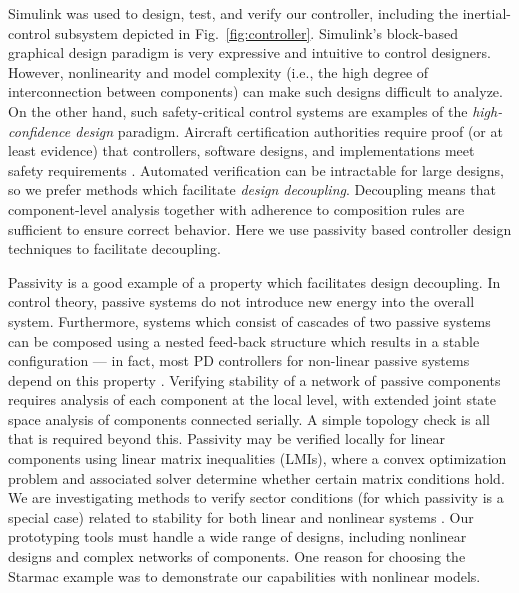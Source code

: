 Simulink was used to design, test, and verify our controller, including the inertial-control subsystem depicted in Fig.~\ref{fig:controller}.  Simulink's block-based graphical design paradigm is very expressive and intuitive to control designers.  However, nonlinearity and model complexity (i.e., the high degree of interconnection between components) can make such designs difficult to analyze. On the other hand, such safety-critical control systems are examples of the \emph{high-confidence design} paradigm. Aircraft certification authorities require proof (or at least evidence) that controllers, software designs, and implementations meet safety requirements \cite{DO178B}.  Automated verification can be intractable for large designs, so we prefer methods which facilitate \emph{design decoupling}.  Decoupling means that component-level analysis together with adherence to composition rules are sufficient to ensure correct behavior. Here we use passivity based controller design techniques \cite{NJ:ISIS-08-911} to facilitate decoupling. 

Passivity is a good example of a property which facilitates design decoupling.  In control theory, passive systems do not introduce new energy into the overall system.  Furthermore, systems which consist of cascades of two passive systems can be composed using a nested feed-back structure which results in a stable configuration --- in fact, most PD controllers for non-linear passive systems depend on this property \cite{NJ:ISIS-08-911}.  Verifying stability of a network of passive components requires analysis of each component at the local level, with extended joint state space analysis of components connected serially.  A simple topology check is all that is required beyond this.  Passivity may be verified locally for linear components using linear matrix inequalities (LMIs), where a convex optimization problem and associated solver determine whether certain matrix conditions hold.  We are investigating methods to verify sector conditions (for which passivity is a special case) related to stability for both linear and nonlinear systems \cite{NJ:ISIS-08-911}. Our prototyping tools must handle a wide range of designs, including nonlinear designs and complex networks of components.  One reason for choosing the Starmac example was to demonstrate our capabilities with nonlinear models.


